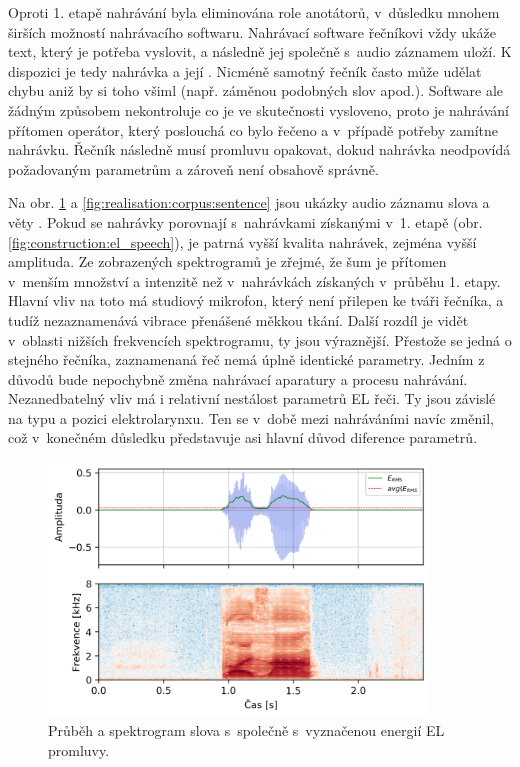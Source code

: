 Oproti 1. etapě nahrávání byla eliminována role anotátorů, v~důsledku mnohem širších možností nahrávacího softwaru.
Nahrávací software řečníkovi vždy ukáže text, který je potřeba vyslovit, a následně jej společně s~audio záznamem uloží.
K dispozici je tedy nahrávka a její .
Nicméně samotný řečník často může udělat chybu aniž by si toho všiml (např. záměnou podobných slov apod.).
Software ale žádným způsobem nekontroluje co je ve skutečnosti vysloveno, proto je nahrávání přítomen operátor, který poslouchá co bylo řečeno a v~případě potřeby zamítne nahrávku.
Řečník následně musí promluvu opakovat, dokud nahrávka neodpovídá požadovaným parametrům a zároveň není obsahově správně.

Na obr. \ref{fig:realisation:corpus:word} a \ref{fig:realisation:corpus:sentence} jsou ukázky audio záznamu slova  a věty .
Pokud se nahrávky porovnají s~nahrávkami získanými v~1. etapě (obr. \ref{fig:construction:el_speech}), je patrná vyšší kvalita nahrávek, zejména vyšší amplituda.
Ze zobrazených spektrogramů je zřejmé, že šum je přítomen v~menším množství a intenzitě než v~nahrávkách získaných v~průběhu 1. etapy.
Hlavní vliv na toto má studiový mikrofon, který není přilepen ke tváři řečníka, a tudíž nezaznamenává vibrace přenášené měkkou tkání.
Další rozdíl je vidět v~oblasti nižších frekvencích spektrogramu, ty jsou výraznější.
Přestože se jedná o stejného řečníka, zaznamenaná řeč nemá úplně identické parametry.
Jedním z důvodů bude nepochybně změna nahrávací aparatury a procesu nahrávání.
Nezanedbatelný vliv má i relativní nestálost parametrů EL řeči.
Ty jsou závislé na typu a pozici elektrolarynxu.
Ten se v~době mezi nahráváními navíc změnil, což v~konečném důsledku představuje asi hlavní důvod diference parametrů.

\begin{figure}[hbpt]
  \centering
  \includegraphics[width=0.9\textwidth]{./ch5-construction/img/energy_spec_word.png}
  \caption[Průběh a spektrogram slova .]{Průběh a spektrogram slova  s~společně s~vyznačenou energií EL promluvy.}
  \label{fig:realisation:corpus:word}
\end{figure}

